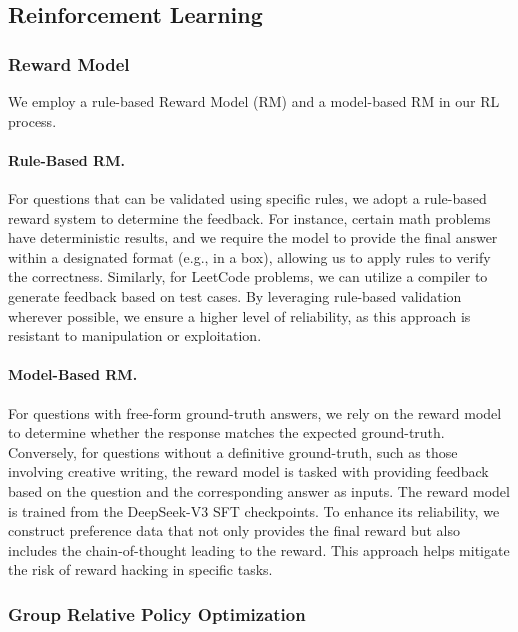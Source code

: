 \documentclass[11pt, a4paper, logo, copyright, nonumbering]{deepseek}
\newcommand{\dsviii}{DeepSeek-V3}
\begin{document}
\begin{CJK*}{UTF8}{gbsn}
\subsection{Reinforcement Learning}

\subsubsection{Reward Model}

We employ a rule-based Reward Model (RM) and a model-based RM in our RL process.

\paragraph{Rule-Based RM.} 
For questions that can be validated using specific rules, we adopt a rule-based reward system to determine the feedback. 
For instance, certain math problems have deterministic results, and we require the model to provide the final answer within a designated format (e.g., in a box), allowing us to apply rules to verify the correctness. 
Similarly, for LeetCode problems, we can utilize a compiler to generate feedback based on test cases. 
By leveraging rule-based validation wherever possible, we ensure a higher level of reliability, as this approach is resistant to manipulation or exploitation.

\paragraph{Model-Based RM.} 
For questions with free-form ground-truth answers, we rely on the reward model to determine whether the response matches the expected ground-truth. 
Conversely, for questions without a definitive ground-truth, such as those involving creative writing, the reward model is tasked with providing feedback based on the question and the corresponding answer as inputs. 
The reward model is trained from the \dsviii{} SFT checkpoints. 
To enhance its reliability, we construct preference data that not only provides the final reward but also includes the chain-of-thought leading to the reward. 
This approach helps mitigate the risk of reward hacking in specific tasks.

\subsubsection{Group Relative Policy Optimization}


\end{CJK*}
\end{document}
